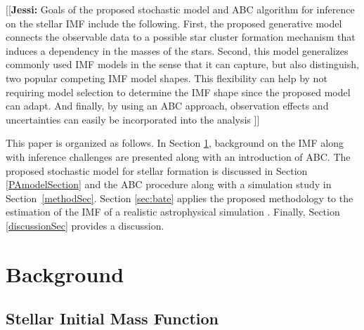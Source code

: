 \documentclass[12pt]{article}
\newcommand{\jessi}[1]{{\color{blue}[[\textbf{Jessi: }#1]]}}
\begin{document}
%

\jessi{
Goals of the proposed stochastic model and ABC algorithm for inference on the stellar IMF include the following.  First, the proposed generative model connects the observable data to a possible star cluster formation mechanism that induces a dependency in the masses of the stars.  Second, this model generalizes commonly used IMF models in the sense that it can capture, but also distinguish, two popular competing IMF model shapes.  This flexibility can help by not requiring model selection to determine the IMF shape since the proposed model can adapt.  And finally, by using an ABC approach, observation effects and uncertainties can easily be incorporated into the analysis
}

This paper is organized as follows. In Section \ref{sec:background}, background on the IMF along with inference challenges are presented along with an introduction of ABC. The proposed stochastic model for stellar formation is discussed in Section \ref{PAmodelSection} and the ABC procedure along with a simulation study in Section~\ref{methodSec}. 
Section \ref{sec:bate} applies the proposed methodology to the estimation of the IMF of a realistic astrophysical simulation  \citep{Bate2012}.
Finally, Section \ref{discussionSec} provides a discussion.



\section{Background}
\label{sec:background}
\subsection{Stellar Initial Mass Function}
\end{document}
